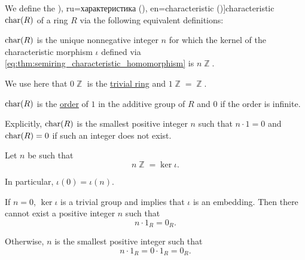 \begin{definition}\label{def:ring_characteristic}
  We define the \term[bg=характеристика (\cite[396]{Обрешков1962ВисшаАлгебра}), ru=характеристика (\cite[32]{Винберг2014Алгебра}), en=characteristic (\cite[148]{Knapp2016BasicAlgebra})]{characteristic} \( \op{char}(R) \) of a ring \( R \) via the following equivalent definitions:
  \begin{thmenum}
    \mimprovised \( \op{char}(R) \) is the unique nonnegative integer \( n \) for which the kernel of the characteristic morphism \( \iota \) defined via \eqref{eq:thm:semiring_characteristic_homomorphism} is \( n\BbbZ \).

    We use here that \( 0\BbbZ \) is the \hyperref[def:ring/trivial]{trivial ring} and \( 1\BbbZ = \BbbZ \).

     \( \op{char}(R) \) is the \hyperref[def:group_order]{order} of \( 1 \) in the additive group of \( R \) and \( 0 \) if the order is infinite.

    Explicitly, \( \op{char}(R) \) is the smallest positive integer \( n \) such that \( n \cdot 1 = 0 \) and \( \op{char}(R) = 0 \) if such an integer does not exist.
  \end{thmenum}
\end{definition}
\begin{comments}
  \item
\end{comments}
\begin{defproof}
   Let \( n \) be such that
  \begin{equation*}
    n \BbbZ = \ker\iota.
  \end{equation*}

  In particular, \( \iota(0) = \iota(n) \).

  If \( n = 0 \), \( \ker\iota \) is a trivial group and  implies that \( \iota \) is an embedding. Then there cannot exist a positive integer \( n \) such that
  \begin{equation*}
    n \cdot 1_R = 0_R.
  \end{equation*}

  Otherwise, \( n \) is the smallest positive integer such that
  \begin{equation*}
    n \cdot 1_R = 0 \cdot 1_R = 0_R.
  \end{equation*}
\end{defproof}

